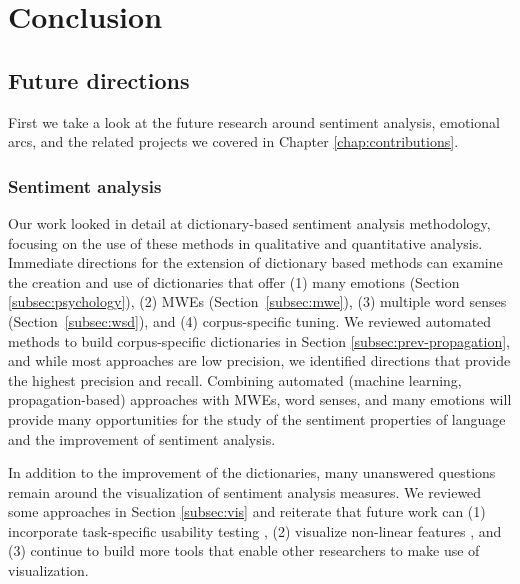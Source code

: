 \chapter{Conclusion}
\label{chap:conclusion}



\section{Future directions}

First we take a look at the future research around sentiment analysis, emotional arcs, and the related projects we covered in Chapter \ref{chap:contributions}.

\subsection{Sentiment analysis}

Our work looked in detail at dictionary-based sentiment analysis methodology, focusing on the use of these methods in qualitative and quantitative analysis.
Immediate directions for the extension of dictionary based methods can examine the creation and use of dictionaries that offer (1) many emotions (Section \ref{subsec:psychology}), (2) MWEs (Section~\ref{subsec:mwe}), (3) multiple word senses (Section~\ref{subsec:wsd}), and (4) corpus-specific tuning.
We reviewed automated methods to build corpus-specific dictionaries in Section \ref{subsec:prev-propagation}, and while most approaches are low precision, we identified directions that provide the highest precision and recall.
Combining automated (machine learning, propagation-based) approaches with MWEs, word senses, and many emotions will provide many opportunities for the study of the sentiment properties of language and the improvement of sentiment analysis.

In addition to the improvement of the dictionaries, many unanswered questions remain around the visualization of sentiment analysis measures.
We reviewed some approaches in Section \ref{subsec:vis} and reiterate that future work can (1) incorporate task-specific usability testing \citep{munzner2014visualization}, (2) visualize non-linear features \citep{ribeiro2016should}, and (3) continue to build more tools that enable other researchers to make use of visualization.

